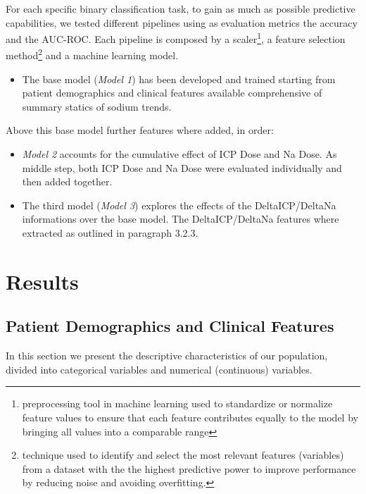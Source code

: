 For each specific binary classification task, to gain as much as possible predictive capabilities, we tested different pipelines using as evaluation metrics the accuracy and the AUC-ROC.
Each pipeline is composed by a scaler\footnote{preprocessing tool in machine learning used to standardize or normalize feature values to ensure that each feature contributes equally to the model by bringing all values into a comparable range}, a feature selection method\footnote {technique used to identify and select the most relevant features (variables) from a dataset with the the highest predictive power to improve performance by reducing noise and avoiding overfitting.} and a machine learning model.
\begin{itemize}
	\item The base model (\textit{Model 1}) has been developed and trained starting from patient demographics and clinical features available comprehensive of summary statics of sodium trends. 
\end{itemize}

Above this base model further features where added, in order:

\begin{itemize}
	\item \textit {Model 2} accounts for the cumulative effect of ICP Dose and Na Dose. As middle step,  both ICP Dose and Na Dose were evaluated individually and then added together.
	\item The third model (\textit{Model 3}) explores the effects of the DeltaICP/DeltaNa informations over the base model. The DeltaICP/DeltaNa features where extracted as outlined in paragraph 3.2.3. 
\end{itemize}

\section {Results}
\subsection{Patient Demographics and Clinical Features}
In this section we present the descriptive characteristics of our population, divided into  categorical variables and numerical (continuous) variables.


